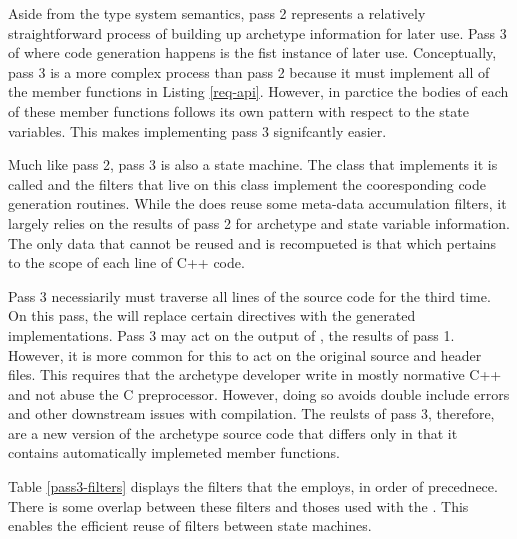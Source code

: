 Aside from the type system semantics, pass 2 represents a relatively straightforward
process of building up archetype information for later use. Pass 3 of \cycpp where 
code generation happens is the fist instance of later use.  Conceptually, 
pass 3 is a more complex process than pass 2 because it must implement 
all of the member functions in Listing \ref{req-api}. However, in parctice the bodies 
of each of these member functions follows its own pattern with respect to the 
state variables. This makes implementing pass 3 signifcantly easier.

Much like pass 2, pass 3 is also a state machine. The class that implements it is 
called  and the filters that live on this class implement 
the cooresponding code generation routines.  While the   does 
reuse some meta-data accumulation filters, it largely relies on the results of 
pass 2 for archetype and state variable information.  The only data that cannot be 
reused and is recompueted is that which pertains to the scope of each line of C++ code.

Pass 3 necessiarily must traverse all lines of the source code for the third time.
On this pass, the  will replace certain 
directives with the generated implementations.  Pass 3 may act on the output of
, the results of pass 1.  However, it is more common for this 
to act on the original source and header files.  This requires that the 
archetype developer write in mostly normative C++ and not abuse the C preprocessor.
However, doing so avoids double include errors and other downstream issues with 
compilation. The reulsts of pass 3, therefore, are a new version of the archetype
source code that differs only in that it contains automatically implemeted 
member functions.

Table \ref{pass3-filters} displays the filters that the  
employs, in order of precednece.  There is some overlap between these filters
and thoses used with the . This enables the efficient reuse
of filters between state machines.

